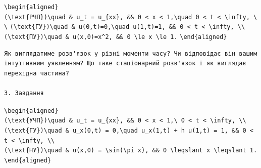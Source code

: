 \documentclass[
  ukrainian,
]{article}
\begin{document}
\texttt{\textbackslash{}begin\{aligned\}}
\texttt{(\textbackslash{}text\{РЧП\})\textbackslash{}quad\ \&\ u\_t\ =\ u\_\{xx\},\ \&\&\ 0\ \textless{}\ x\ \textless{}\ 1,\textbackslash{}quad\ 0\ \textless{}\ t\ \textless{}\ \textbackslash{}infty,\ \textbackslash{}\textbackslash{}}
\texttt{(\textbackslash{}text\{ГУ\})\textbackslash{}quad\ \&\ u(0,t)=0,\textbackslash{}quad\ u(1,t)=1,\ \&\&\ 0\ \textless{}\ t\ \textless{}\ \textbackslash{}infty,\ \textbackslash{}\textbackslash{}}
\texttt{(\textbackslash{}text\{ПУ\})\textbackslash{}quad\ \&\ u(x,0)=x\^{}2,\ \&\&\ 0\ \textbackslash{}le\ x\ \textbackslash{}le\ 1.}
\texttt{\textbackslash{}end\{aligned\}}

\begin{verbatim}
Як виглядатиме розв'язок у різні моменти часу? Чи відповідає він вашим інтуїтивним уявленням? Що таке стаціонарний розв'язок і як виглядає перехідна частина?

3. Завдання
\end{verbatim}

\texttt{\textbackslash{}begin\{aligned\}}
\texttt{(\textbackslash{}text\{УЧП\})\textbackslash{}quad\ \&\ u\_t\ =\ u\_\{xx\},\ \&\&\ 0\ \textless{}\ x\ \textless{}\ 1,\textbackslash{}\ 0\ \textless{}\ t\ \textless{}\ \textbackslash{}infty,\ \textbackslash{}\textbackslash{}}
\texttt{(\textbackslash{}text\{ГУ\})\textbackslash{}quad\ \&\ u\_x(0,t)\ =\ 0,\textbackslash{}quad\ u\_x(1,t)\ +\ h\ u(1,t)\ =\ 1,\ \&\&\ 0\ \textless{}\ t\ \textless{}\ \textbackslash{}infty,\ \textbackslash{}\textbackslash{}}
\texttt{(\textbackslash{}text\{НУ\})\textbackslash{}quad\ \&\ u(x,0)\ =\ \textbackslash{}sin(\textbackslash{}pi\ x),\ \&\&\ 0\ \textbackslash{}leqslant\ x\ \textbackslash{}leqslant\ 1.}
\texttt{\textbackslash{}end\{aligned\}}
\end{document}
